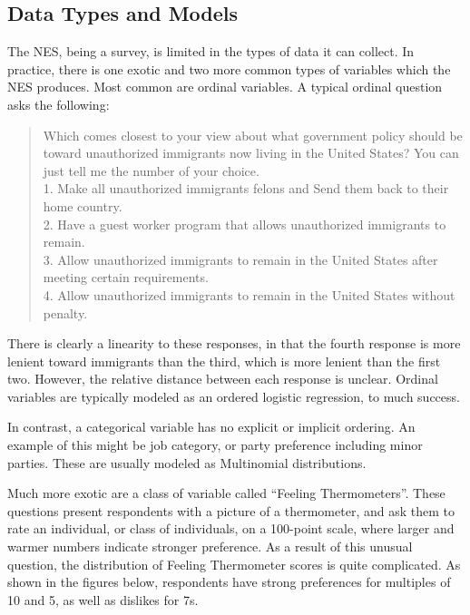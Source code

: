 \documentclass{article}
\begin{document}
\subsection{Data Types and Models}
\label{sec:data}
The NES, being a survey, is limited in the types of data it can collect. In practice, there is one exotic and two more common types of variables which the NES produces. Most common are ordinal variables. A typical ordinal question asks the following:

\begin{verse}
Which comes closest to your view about what government policy should be toward unauthorized immigrants now living in the United States? You can just tell me the number of your choice.\\

1. Make all unauthorized immigrants felons and Send them back to their home country. \\
2. Have a guest worker program that allows unauthorized immigrants to remain. \\
3. Allow unauthorized immigrants to remain in the United States after meeting certain requirements.\\
4. Allow unauthorized immigrants to remain in the United States without penalty.\\
\end{verse}

There is clearly a linearity to these responses, in that the fourth response is more lenient toward immigrants than the third, which is more lenient than the first two. However, the relative distance between each response is unclear. Ordinal variables are typically modeled as an ordered logistic regression, to much success.

In contrast, a categorical variable has no explicit or implicit ordering. An example of this might be job category, or party preference including minor parties. These are usually modeled as Multinomial distributions.

Much more exotic are a class of variable called ``Feeling Thermometers''. These questions present respondents with a picture of a thermometer, and ask them to rate an individual, or class of individuals, on a 100-point scale, where larger and warmer numbers indicate stronger preference. As a result of this unusual question, the distribution of Feeling Thermometer scores is quite complicated. As shown in the figures below, respondents have strong preferences for multiples of 10 and 5, as well as dislikes for 7s. 
\end{document}
